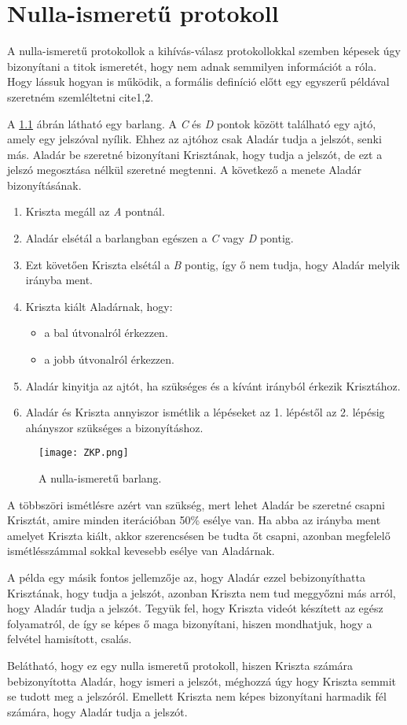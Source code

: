 \chapter{Nulla-ismeretű protokoll}

A nulla-ismeretű protokollok a kihívás-válasz protokollokkal szemben képesek úgy bizonyítani a titok ismeretét, hogy nem adnak semmilyen információt a róla. Hogy lássuk hogyan is működik, a formális definíció előtt egy egyszerű példával szeretném szemléltetni cite1,2.

A \ref{Figure::ZKcave} ábrán látható egy barlang. A \textit{C} és \textit{D} pontok között található egy ajtó, amely egy jelszóval nyílik. Ehhez az ajtóhoz csak Aladár tudja a jelszót, senki más. Aladár be szeretné bizonyítani Krisztának, hogy tudja a jelszót, de ezt a jelszó megosztása nélkül szeretné megtenni. A következő a menete Aladár bizonyításának.

\begin{enumerate}
    \item Kriszta megáll az \textit{A} pontnál.
    \item Aladár elsétál a barlangban egészen a \textit{C} vagy \textit{D} pontig.
    \item Ezt követően Kriszta elsétál a \textit{B} pontig, így ő nem tudja, hogy Aladár melyik irányba ment.
    \item Kriszta kiált Aladárnak, hogy:
        \begin{itemize}
            \item a bal útvonalról érkezzen.
            \item a jobb útvonalról érkezzen.
        \end{itemize}
    \item Aladár kinyitja az ajtót, ha szükséges és a kívánt irányból érkezik Krisztához.
    \item Aladár és Kriszta annyiszor ismétlik a lépéseket az 1. lépéstől az 2. lépésig ahányszor szükséges a bizonyításhoz.
\end{enumerate}

\begin{figure}[H]
    \centering
    \texttt{[image: ZKP.png]}
    \caption{A nulla-ismeretű barlang.}
    \label{Figure::ZKcave}
\end{figure}

A többszöri ismétlésre azért van szükség, mert lehet Aladár be szeretné csapni Krisztát, amire minden iterációban 50\% esélye van. Ha abba az irányba ment amelyet Kriszta kiált, akkor szerencsésen be tudta őt csapni, azonban megfelelő ismétlésszámmal sokkal kevesebb esélye van Aladárnak.

A példa egy másik fontos jellemzője az, hogy Aladár ezzel bebizonyíthatta Krisztának, hogy tudja a jelszót, azonban Kriszta nem tud meggyőzni más arról, hogy Aladár tudja a jelszót. Tegyük fel, hogy Kriszta videót készített az egész folyamatról, de így se képes ő maga bizonyítani, hiszen mondhatjuk, hogy a felvétel hamisított, csalás.

Belátható, hogy ez egy nulla ismeretű protokoll, hiszen Kriszta számára bebizonyította Aladár, hogy ismeri a jelszót, méghozzá úgy hogy Kriszta semmit se tudott meg a jelszóról. Emellett Kriszta nem képes bizonyítani harmadik fél számára, hogy Aladár tudja a jelszót.